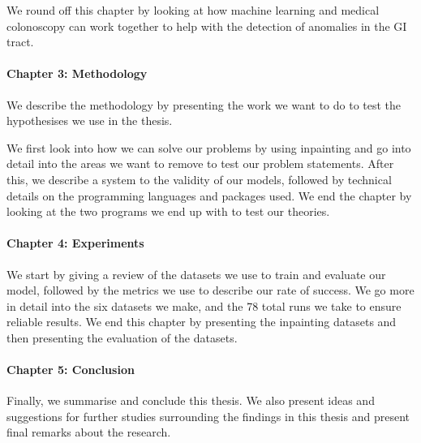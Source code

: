 We round off this chapter by looking at how machine learning and medical colonoscopy can work together to help with the detection of anomalies in the GI tract.

\paragraph{Chapter 3: Methodology }
We describe the methodology by presenting the work we want to do to test the hypothesises we use in the thesis.

We first look into how we can solve our problems by using inpainting and go into detail into the areas we want to remove to test our problem statements. 
After this, we describe a system to the validity of our models, followed by technical details on the programming languages and packages used.
We end the chapter by looking at the two programs we end up with to test our theories. 


\paragraph{Chapter 4: Experiments}
We start by giving a review of the datasets we use to train and evaluate our model, followed by the metrics we use to describe our rate of success.
We go more in detail into the six datasets we make, and the 78 total runs we take to ensure reliable results.
We end this chapter by presenting the inpainting datasets and then presenting the evaluation of the datasets.


\paragraph{Chapter 5: Conclusion}
Finally, we summarise and conclude this thesis.
We also present ideas and suggestions for further studies surrounding
the findings in this thesis and present final remarks about the research.

